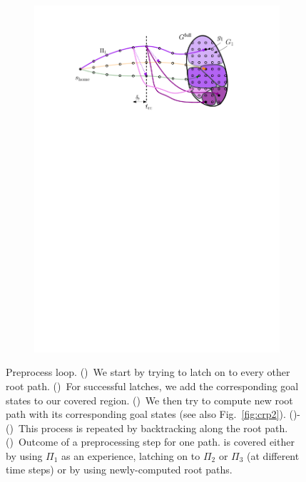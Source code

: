 \documentclass[conference]{IEEEtran}
\begin{document}
\begin{figure}[t]
\begin{subfigure}{0.225\textwidth}
        \includegraphics[width=\textwidth]{3_preprocess_loop_7}
        \caption{}
        \label{fig:pl7}
    \end{subfigure}
    \caption{\CaptionTextSize
    Preprocess loop.
    ()~We start by trying to latch on to every other root path. 
    ()~For successful latches, we add the corresponding goal states to our covered region.
    ()~We then try to compute new root path with its corresponding goal states (see also Fig.~\ref{fig:crp2}).
    ()-()~This process is repeated by backtracking along the root path.
    ()~Outcome of a preprocessing step for one path. \Gfull is covered either by using $\Pi_1$ as an experience, 
    latching on to $\Pi_2$ or  $\Pi_3$ (at different time steps)
    or by 
    using newly-computed root paths. 
    }
    \label{fig:pl}
\end{figure}
\end{document}
